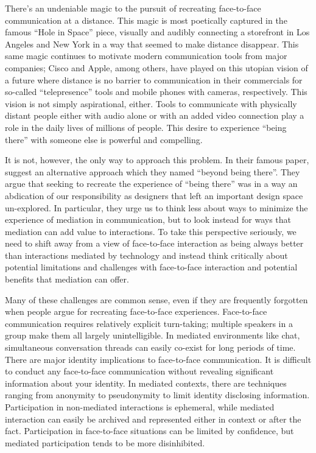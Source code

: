\documentclass{tufte-handout}
\begin{document}

There's an undeniable magic to the pursuit of recreating face-to-face communication at a distance. This magic is most poetically captured in the famous ``Hole in Space'' \citep{HoleinSpace:1980vn} piece, visually and audibly connecting a storefront in Los Angeles and New York in a way that seemed to make distance disappear. This same magic continues to motivate modern communication tools from major companies; Cisco and Apple, among others, have played on this utopian vision of a future where distance is no barrier to communication in their commercials for so-called ``telepresence'' tools and mobile phones with cameras, respectively. This vision is not simply aspirational, either. Tools to communicate with physically distant people either with audio alone or with an added video connection play a role in the daily lives of millions of people. This desire to experience ``being there'' with someone else is powerful and compelling. 

It is not, however, the only way to approach this problem. In their famous paper, \citet{Hollan:1992tz} suggest an alternative approach which they named ``beyond being there''. They argue that seeking to recreate the experience of ``being there'' was in a way an abdication of our responsibility as designers that left an important design space un-explored. In particular, they urge us to think less about ways to minimize the experience of mediation in communication, but to look instead for ways that mediation can add value to interactions. To take this perspective seriously, we need to shift away from a view of face-to-face interaction as being always better than interactions mediated by technology and instead think critically about potential limitations and challenges with face-to-face interaction and potential benefits that mediation can offer. 


Many of these challenges are common sense, even if they are frequently forgotten when people argue for recreating face-to-face experiences. Face-to-face communication requires relatively explicit turn-taking; multiple speakers in a group make them all largely unintelligible. In mediated environments like chat, simultaneous conversation threads can easily co-exist for long periods of time. There are major identity implications to face-to-face communication. It is difficult to conduct any face-to-face communication without revealing significant information about your identity. In mediated contexts, there are techniques ranging from anonymity to pseudonymity to limit identity disclosing information. Participation in non-mediated interactions is ephemeral, while mediated interaction can easily be archived and represented either in context or after the fact. Participation in face-to-face situations can be limited by confidence, but mediated participation tends to be more disinhibited. \citep{Siegel:1986ve}
\end{document}
